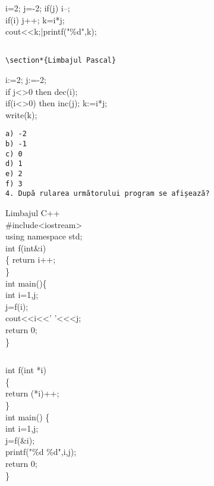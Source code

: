 \begin{verbatim}

\end{verbatim}

i=2; j=-2; if(j) i--;\\
if(i) j++; k=i*j;\\
cout<<k;|printf("\%d",k);

\begin{verbatim}

\section*{Limbajul Pascal}
\end{verbatim}

i:=2; j:=-2;\\
if j<>0 then dec(i);\\
if(i<>0) then inc(j); k:=i*j;\\
write(k);

\begin{verbatim}
a) -2
b) -1
c) 0
d) 1
e) 2
f) 3
4. După rularea următorului program se afișează?
\end{verbatim}

Limbajul C++\\
\#include<iostream>\\
using namespace std;\\
int f(int\&i)\\
\{ return i++;\\
\}\\
int main()\{\\
int i=1,j;\\
j=f(i);\\
cout<<i<<' '<<<j;\\
return 0;\\
\}

\begin{verbatim}

\end{verbatim}

int f(int *i)\\
\{\\
return (*i)++;\\
\}\\
int main() \{\\
int i=1,j;\\
j=f(\&i);\\
printf("\%d \%d",i,j);\\
return 0;\\
\}

